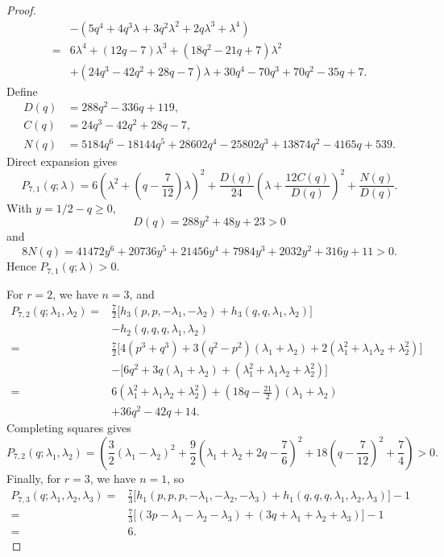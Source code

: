 \documentclass[11pt]{article}
\numberwithin{equation}{section}
\begin{document}
\begin{proof}
\[\begin{aligned}
         &-(5q^4+4q^3\lambda+3q^2\lambda^2
             +2q\lambda^3+\lambda^4)\\
      ={}&6\lambda^4+(12q-7)\lambda^3
          +(18q^2-21q+7)\lambda^2\\
         &+(24q^3-42q^2+28q-7)\lambda
          +30q^4-70q^3+70q^2-35q+7.
    \end{aligned}
  \]
  Define
  \[
    \begin{aligned}
      D(q)&=288q^2-336q+119,\\
      C(q)&=24q^3-42q^2+28q-7,\\
      N(q)&=5184q^6-18144q^5+28602q^4-25802q^3 +13874q^2-4165q+539.
    \end{aligned}
  \]
  Direct expansion gives
  \[
    P_{7,1}(q;\lambda)=
      6\left(\lambda^2+\left(q-\frac7{12}\right)\lambda\right)^2+\frac{D(q)}{24}
      \left(\lambda+\frac{12C(q)}{D(q)}\right)^2
      +\frac{N(q)}{D(q)}.
  \]
  With $y=1/2-q\ge0$,
  \[
    D(q)=288y^2+48y+23>0
  \]
  and
  \[
    8N(q)=41472y^6+20736y^5+21456y^4+7984y^3+2032y^2+316y+11>0.
  \]
  Hence $P_{7,1}(q;\lambda)>0$.

  For $r=2$, we have $n=3$, and
  \[
    \begin{aligned}
      P_{7,2}(q;\lambda_1,\lambda_2)
      ={}&\frac72\bigl[
        h_3(p,p,-\lambda_1,-\lambda_2)
        +h_3(q,q,\lambda_1,\lambda_2)\bigr]\\
        &-h_2(q,q,q,\lambda_1,\lambda_2)\\
      ={}&\frac72\bigl[4(p^3+q^3)
        +3(q^2-p^2)(\lambda_1+\lambda_2)
        +2(\lambda_1^2+\lambda_1\lambda_2+\lambda_2^2)\bigr]\\
        &-\bigl[6q^2+3q(\lambda_1+\lambda_2)
          +(\lambda_1^2+\lambda_1\lambda_2+\lambda_2^2)\bigr]\\
      ={}&6(\lambda_1^2+\lambda_1\lambda_2+\lambda_2^2)
        +\left(18q-\frac{21}{2}\right)(\lambda_1+\lambda_2)\\
        &+36q^2-42q+14.
    \end{aligned}
  \]
  Completing squares gives
  \[
      P_{7,2}(q;\lambda_1,\lambda_2)=
      \left(\frac32(\lambda_1-\lambda_2)^2
      +\frac92\left(\lambda_1+\lambda_2+2q-\frac76\right)^2
      +18\left(q-\frac7{12}\right)^2+\frac74\right)>0.
  \]
  Finally, for $r=3$, we have $n=1$, so
  \[
    \begin{aligned}
      P_{7,3}(q;\lambda_1,\lambda_2,\lambda_3)
      ={}&\frac73\bigl[
        h_1(p,p,p,-\lambda_1,-\lambda_2,-\lambda_3)
        +h_1(q,q,q,\lambda_1,\lambda_2,\lambda_3)\bigr]-1\\
      ={}&\frac73\bigl[(3p-\lambda_1-\lambda_2-\lambda_3)
        +(3q+\lambda_1+\lambda_2+\lambda_3)\bigr]-1
      \\
      ={}&6.
    \end{aligned}
  \]


\end{proof}
\end{document}

